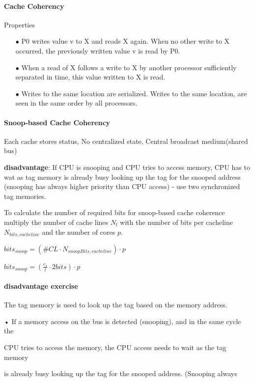 \documentclass[fontsize=8pt]{scrartcl}
\newcommand{\coloreq}[1]{\colorbox{nordicRed}{\(\displaystyle #1\)}}
\begin{document}
\begin{multicols*}{4}
\paragraph{Cache Coherency} Properties
\begin{enumerate}
  \item[$\bullet$] P0 writes value v to X and reads X again. When no other write to X occurred, the previously written value v is read by P0.
  \item[$\bullet$] When a read of X follows a write to X by another processor sufficiently separated in time, this value written to X is read.
  \item[$\bullet$] Writes to the same location are serialized. Writes to the same location, are seen in the same order by all processors.
\end{enumerate}

\paragraph{Snoop-based Cache Coherency}

Each cache stores status, No centralized state, Central broadcast medium(shared bus)

\textbf{disadvantage}: If CPU is snooping and CPU tries to access memory, CPU has to wat as tag memory is already busy looking up the tag for the snooped address (snooping has always higher priority than CPU access) - use two synchronized tag memories.

To calculate the number of required bits for snoop-based cache coherence multiply the number of cache lines $N_l$ with the number of bits per cacheline $N_{bits,cacheline}$ and the number of cores $p$. 

\coloreq{bits_{snoop} = (\#CL \cdot N_{snoopBits,cacheline}) \cdot p}

\coloreq{bits_{snoop} = (\frac{c_1}{l} \cdot 2bits) \cdot p}

\paragraph{disadvantage exercise} The tag memory is used to look up the tag based on the memory address.


• If a memory access on the bus is detected (snooping), and in the same cycle the

CPU tries to access the memory, the CPU access needs to wait as the tag memory

is already busy looking up the tag for the snooped address. (Snooping always


\end{multicols*}
\end{document}
